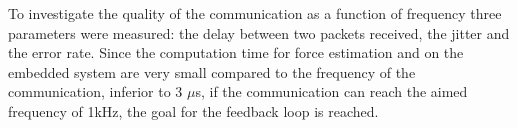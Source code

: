 To investigate the quality of the communication as a function of frequency three parameters were measured: the delay between two packets received, the jitter and the error rate. Since the computation time for force estimation and on the embedded system are very small compared to the frequency of the communication, inferior to 3 $\mu$s, if the communication can reach the aimed frequency of 1kHz, the goal for the feedback loop is reached.
